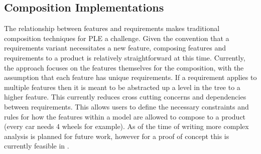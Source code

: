 \subsection{Composition Implementations}

The relationship between features and requirements makes traditional composition techniques for \ac{PLE} a challenge. Given the convention that a requirements variant necessitates a new feature, composing features and requirements to a product is relatively straightforward at this time. Currently, the approach focuses on the features themselves for the composition, with the assumption that each feature has unique requirements. If a requirement applies to multiple features then it is meant to be abstracted up a level in the tree to a higher feature. This currently reduces cross cutting concerns and dependencies between requirements. This allows users to define the necessary constraints and rules for how the features within a model are allowed to compose to a product (every car needs 4 wheels for example). As of the time of writing more complex analysis is planned for future work, however for a proof of concept this is currently feasible in \tool.

